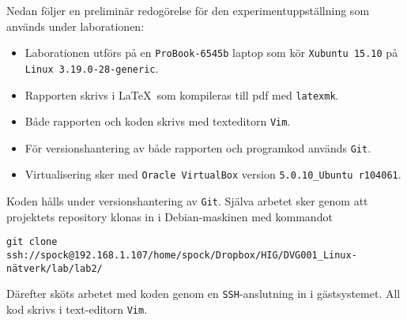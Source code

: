 Nedan följer en preliminär redogörelse för den experimentuppställning som används
under laborationen:

\begin{itemize}
  \item Laborationen utförs på en \texttt{ProBook-6545b} laptop som kör
        \texttt{Xubuntu 15.10} på \texttt{Linux 3.19.0-28-generic}.

  \item Rapporten skrivs i \LaTeX\  som kompileras till pdf med \texttt{latexmk}.

  \item Både rapporten och koden skrivs med texteditorn \texttt{Vim}.

  \item För versionshantering av både rapporten och programkod används \texttt{Git}.

  \item Virtualisering sker med \texttt{Oracle VirtualBox} version
        \texttt{5.0.10\_Ubuntu r104061}.
\end{itemize}

Koden hålls under versionshantering av \texttt{Git}. Själva arbetet sker genom att
projektets repository klonas in i Debian-maskinen med kommandot
\begin{verbatim}
git clone ssh://spock@192.168.1.107/home/spock/Dropbox/HIG/DVG001_Linux-nätverk/lab/lab2/
\end{verbatim}

Därefter sköts arbetet med koden genom en \texttt{SSH}-anslutning in i gästsystemet.
All kod skrivs i text-editorn \texttt{Vim}.

